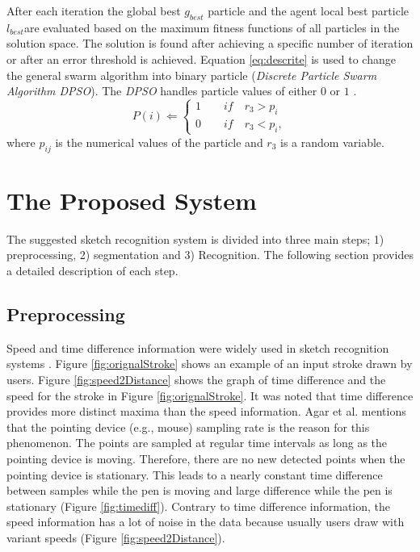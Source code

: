 \documentclass[preprint,10pt,5p,twocolumn]{elsarticle}
\begin{document}
 After each iteration the global best $g_{best}$ particle and the agent local best particle $l_{best}$are evaluated based on the maximum fitness functions of all particles in the solution space. The solution is found after achieving a specific number of iteration or after an error threshold is achieved.
Equation \ref{eq:descrite} is used to change the general swarm algorithm into binary particle (\textit{Discrete Particle Swarm Algorithm DPSO}). The \textit{DPSO} handles particle values of either $0$ or $1$ \cite{PSODisceret}.  
\begin{equation}
   P(i)\Leftarrow 
\left \{
\begin{array}{c} 
1 \quad \quad if\quad r_{3}>p_{i}  \\

0 \quad \quad if\quad r_{3}<p_{i}, 
\label{eq:descrite}
\end{array}\right.
\end{equation}
 where $p_{ij}$ is the numerical values of the particle and $r_{3}$ is a random variable. 


\section{The Proposed System}
\label{Sysdisc}
 The suggested sketch recognition system is divided into three main steps; 1) preprocessing, 2) segmentation and 3) Recognition. The following section provides a detailed description of each step.
 
\subsection{Preprocessing}
\label{Prepross} 
 Speed and time difference information were widely used in sketch recognition systems \cite{earlyprocess}. Figure \ref{fig:orignalStroke} shows an example of an input stroke drawn by users.  Figure \ref{fig:speed2Distance} shows the graph of time difference and the speed for the stroke in Figure \ref{fig:orignalStroke}. It was noted that time difference provides more distinct maxima than the speed information. Agar et al. \cite{polygonfeedback31} mentions that the pointing device (e.g., mouse) sampling rate is the reason for this phenomenon. The points are sampled at regular time intervals as long as the pointing device is moving. Therefore, there are no new detected points when the pointing device is stationary. This leads to a nearly constant time difference between samples while the pen is moving and large difference while the pen is stationary (Figure \ref{fig:timediff}). Contrary to time difference information, the speed information has a lot of noise in the data because usually  users draw with variant speeds (Figure \ref{fig:speed2Distance}).  %
\end{document}
